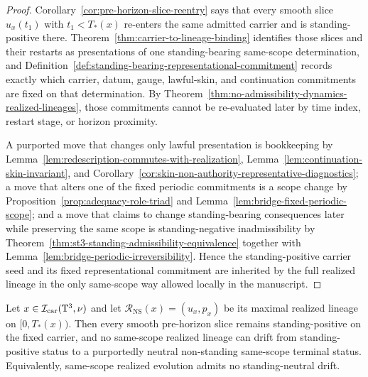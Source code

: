 \begin{proof}
Corollary~\ref{cor:pre-horizon-slice-reentry} says that every smooth slice $u_x(t_1)$ with $t_1<T_*(x)$ re-enters the same admitted carrier and is standing-positive there. Theorem~\ref{thm:carrier-to-lineage-binding} identifies those slices and their restarts as presentations of one standing-bearing same-scope determination, and Definition~\ref{def:standing-bearing-representational-commitment} records exactly which carrier, datum, gauge, lawful-skin, and continuation commitments are fixed on that determination. By Theorem~\ref{thm:no-admissibility-dynamics-realized-lineages}, those commitments cannot be re-evaluated later by time index, restart stage, or horizon proximity.

A purported move that changes only lawful presentation is bookkeeping by Lemma~\ref{lem:redescription-commutes-with-realization}, Lemma~\ref{lem:continuation-skin-invariant}, and Corollary~\ref{cor:skin-non-authority-representative-diagnostics}; a move that alters one of the fixed periodic commitments is a scope change by Proposition~\ref{prop:adequacy-role-triad} and Lemma~\ref{lem:bridge-fixed-periodic-scope}; and a move that claims to change standing-bearing consequences later while preserving the same scope is standing-negative inadmissibility by Theorem~\ref{thm:st3-standing-admissibility-equivalence} together with Lemma~\ref{lem:bridge-periodic-irreversibility}. Hence the standing-positive carrier seed and its fixed representational commitment are inherited by the full realized lineage in the only same-scope way allowed locally in the manuscript.
\end{proof}

\begin{manualtheorem}
\label{thm:st4-standing-conservation-realized-lineages}
Let $x\in\mathcal I_{\mathrm{car}}(\mathbb{T}^3,\nu)$ and let $\mathcal R_{\mathrm{NS}}(x)=(u_x,p_x)$ be its maximal realized lineage on $[0,T_*(x))$. Then every smooth pre-horizon slice remains standing-positive on the fixed carrier, and no same-scope realized lineage can drift from standing-positive status to a purportedly neutral non-standing same-scope terminal status. Equivalently, same-scope realized evolution admits no standing-neutral drift.
\end{manualtheorem}

